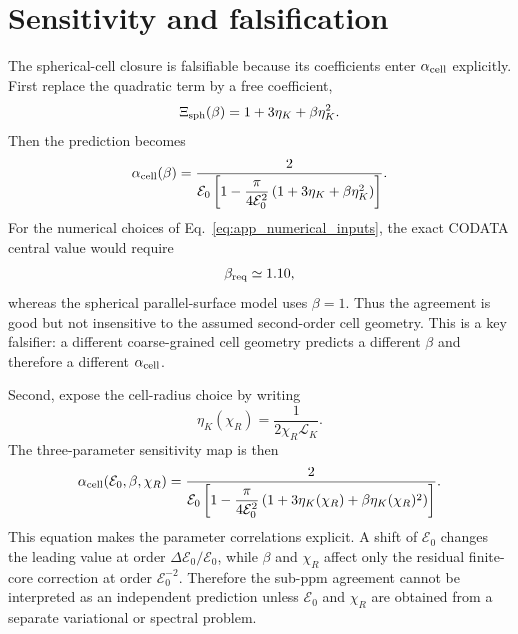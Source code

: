 \documentclass[aps,pra,preprint,longbibliography,nofootinbib]{revtex4-2}
\begin{document}
\section{Sensitivity and falsification}
\label{app:sensitivity}

The spherical-cell closure is falsifiable because its coefficients enter
$\alpha_{\rm cell}$ explicitly.  First replace the quadratic term by a free
coefficient,
\begin{equation}
  \Xi_{\rm sph}(\beta)
  =1+3\eta_K+\beta\eta_K^2 .
  \label{eq:app_beta_sensitivity}
\end{equation}
Then the prediction becomes
\begin{equation}
  \alpha_{\rm cell}(\beta)
  =\frac{2}{\mathcal E_0\left[1-
  \dfrac{\pi}{4\mathcal E_0^2}\left(1+3\eta_K+\beta\eta_K^2\right)\right]} .
  \label{eq:app_alpha_beta}
\end{equation}
For the numerical choices of Eq.~\eqref{eq:app_numerical_inputs}, the exact
CODATA central value would require
\begin{equation}
  \beta_{\rm req}\simeq1.10,
  \label{eq:app_beta_req}
\end{equation}
whereas the spherical parallel-surface model uses $\beta=1$.  Thus the
agreement is good but not insensitive to the assumed second-order cell
geometry.  This is a key falsifier: a different coarse-grained cell geometry
predicts a different $\beta$ and therefore a different $\alpha_{\rm cell}$.

Second, expose the cell-radius choice by writing
\begin{equation}
  \eta_K(\chi_R)=\frac{1}{2\chi_R\mathcal L_K}.
  \label{eq:app_eta_chi_sensitivity}
\end{equation}
The three-parameter sensitivity map is then
\begin{equation}
  \alpha_{\rm cell}(\mathcal E_0,\beta,\chi_R)
  =\frac{2}{\mathcal E_0\left[1-
  \dfrac{\pi}{4\mathcal E_0^2}
  \left(1+3\eta_K(\chi_R)+\beta\eta_K(\chi_R)^2\right)
  \right]} .
  \label{eq:app_alpha_E_beta_chi}
\end{equation}
This equation makes the parameter correlations explicit.  A shift of
$\mathcal E_0$ changes the leading value at order $\Delta\mathcal E_0/
\mathcal E_0$, while $\beta$ and $\chi_R$ affect only the residual
finite-core correction at order $\mathcal E_0^{-2}$.  Therefore the
sub-ppm agreement cannot be interpreted as an independent prediction unless
$\mathcal E_0$ and $\chi_R$ are obtained from a separate variational or
spectral problem.
\end{document}
